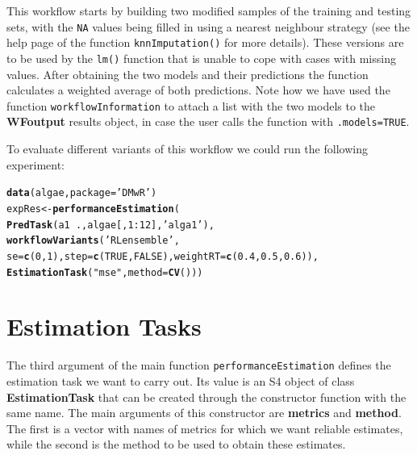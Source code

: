 \documentclass[10pt,a4paper]{article}\usepackage[]{graphicx}\usepackage[]{color}
\makeatletter
\newcommand{\hlnum}[1]{\textcolor[rgb]{0.686,0.059,0.569}{#1}}%
\newcommand{\hlstr}[1]{\textcolor[rgb]{0.192,0.494,0.8}{#1}}%
\newcommand{\hlopt}[1]{\textcolor[rgb]{0,0,0}{#1}}%
\newcommand{\hlstd}[1]{\textcolor[rgb]{0.345,0.345,0.345}{#1}}%
\newcommand{\hlkwb}[1]{\textcolor[rgb]{0.69,0.353,0.396}{#1}}%
\newcommand{\hlkwc}[1]{\textcolor[rgb]{0.333,0.667,0.333}{#1}}%
\newcommand{\hlkwd}[1]{\textcolor[rgb]{0.737,0.353,0.396}{\textbf{#1}}}%
\newenvironment{kframe}{%
 \def\at@end@of@kframe{}%
 \ifinner\ifhmode%
  \def\at@end@of@kframe{\end{minipage}}%
  \begin{minipage}{\columnwidth}%
 \fi\fi%
 \def\FrameCommand##1{\hskip\@totalleftmargin \hskip-\fboxsep
 \colorbox{shadecolor}{##1}\hskip-\fboxsep
     \hskip-\linewidth \hskip-\@totalleftmargin \hskip\columnwidth}%
 \MakeFramed {\advance\hsize-\width
   \@totalleftmargin\z@ \linewidth\hsize
   \@setminipage}}%
 {\par\unskip\endMakeFramed%
 \at@end@of@kframe}
\newenvironment{knitrout}{}{} %
\makeatother
\begin{document}
This workflow starts by building two modified samples of the training
and testing sets, with the \texttt{NA} values being filled in using a
nearest neighbour strategy (see the help page of the function
\texttt{knnImputation()} for more
details). These versions are to be used by the \texttt{lm()} function
that is unable to cope with cases with missing values. After obtaining
the two models and their predictions the function calculates a
weighted average of both predictions. Note how we have used the function \texttt{workflowInformation} to attach a list with the two models to the \textbf{WFoutput} results object, in case the user calls the function with \texttt{.models=TRUE}.

To evaluate different variants of this workflow we could run the
following experiment:

\begin{knitrout}\footnotesize
{}\color{fgcolor}\begin{kframe}
\begin{alltt}
\hlkwd{data}\hlstd{(algae,}\hlkwc{package}\hlstd{=}\hlstr{'DMwR'}\hlstd{)}
\hlstd{expRes} \hlkwb{<-} \hlkwd{performanceEstimation}\hlstd{(}
    \hlkwd{PredTask}\hlstd{(a1} \hlopt{~} \hlstd{.,algae[,}\hlnum{1}\hlopt{:}\hlnum{12}\hlstd{],}\hlstr{'alga1'}\hlstd{),}
    \hlkwd{workflowVariants}\hlstd{(}\hlstr{'RLensemble'}\hlstd{,}
                     \hlkwc{se}\hlstd{=}\hlkwd{c}\hlstd{(}\hlnum{0}\hlstd{,}\hlnum{1}\hlstd{),}\hlkwc{step}\hlstd{=}\hlkwd{c}\hlstd{(}\hlnum{TRUE}\hlstd{,}\hlnum{FALSE}\hlstd{),}\hlkwc{weightRT}\hlstd{=}\hlkwd{c}\hlstd{(}\hlnum{0.4}\hlstd{,}\hlnum{0.5}\hlstd{,}\hlnum{0.6}\hlstd{)),}
    \hlkwd{EstimationTask}\hlstd{(}\hlstr{"mse"}\hlstd{,}\hlkwc{method}\hlstd{=}\hlkwd{CV}\hlstd{()))}
\end{alltt}
\end{kframe}
\end{knitrout}


\section{Estimation Tasks}

The third argument of the main function \texttt{performanceEstimation} defines the estimation task we want to carry out. Its value is an S4 object of class \textbf{EstimationTask} that can be created through the constructor function with the same name. The main arguments of this constructor are \textbf{metrics} and \textbf{method}. The first is a vector with names of metrics for which we want reliable estimates, while the second is the method to be used to obtain these estimates.
\end{document}
